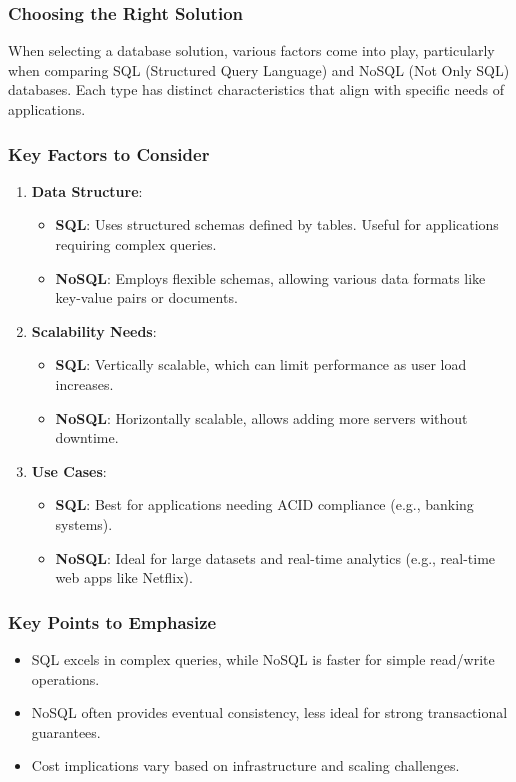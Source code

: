 \documentclass[aspectratio=169]{beamer}
\begin{document}
\begin{frame}[fragile]
    \frametitle{Choosing the Right Solution}
    When selecting a database solution, various factors come into play, particularly when comparing SQL (Structured Query Language) and NoSQL (Not Only SQL) databases. Each type has distinct characteristics that align with specific needs of applications.
\end{frame}

\begin{frame}[fragile]
    \frametitle{Key Factors to Consider}
    \begin{enumerate}
        \item \textbf{Data Structure}:
            \begin{itemize}
                \item \textbf{SQL}: Uses structured schemas defined by tables. Useful for applications requiring complex queries.
                \item \textbf{NoSQL}: Employs flexible schemas, allowing various data formats like key-value pairs or documents.
            \end{itemize}
        \item \textbf{Scalability Needs}:
            \begin{itemize}
                \item \textbf{SQL}: Vertically scalable, which can limit performance as user load increases.
                \item \textbf{NoSQL}: Horizontally scalable, allows adding more servers without downtime.
            \end{itemize}
        \item \textbf{Use Cases}:
            \begin{itemize}
                \item \textbf{SQL}: Best for applications needing ACID compliance (e.g., banking systems).
                \item \textbf{NoSQL}: Ideal for large datasets and real-time analytics (e.g., real-time web apps like Netflix).
            \end{itemize}
    \end{enumerate}
\end{frame}

\begin{frame}[fragile]
    \frametitle{Key Points to Emphasize}
    \begin{itemize}
        \item SQL excels in complex queries, while NoSQL is faster for simple read/write operations.
        \item NoSQL often provides eventual consistency, less ideal for strong transactional guarantees.
        \item Cost implications vary based on infrastructure and scaling challenges.
    \end{itemize}
\end{frame}
\end{document}

